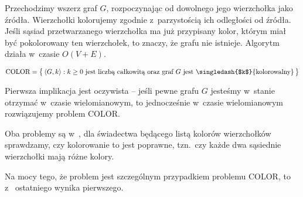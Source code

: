 
\subproblem %
Przechodzimy wszerz graf $G$, rozpoczynając od dowolnego jego wierzchołka jako źródła.
Wierzchołki kolorujemy zgodnie z~parzystością ich odległości od źródła.
Jeśli sąsiad przetwarzanego wierzchołka ma już przypisany kolor, którym miał być pokolorowany ten wierzchołek, to znaczy, że  grafu nie istnieje.
Algorytm działa w~czasie $O(V+E)$.

\subproblem %
\[
	\text{COLOR} = \bigl\{\,\langle G,k\rangle:\text{$k\ge0$ jest liczbą całkowitą oraz graf $G$ jest \singledash{$k$}{kolorowalny}}\,\bigr\}
\]

Pierwsza implikacja jest oczywista -- jeśli pewne  grafu $G$ jesteśmy w~stanie otrzymać w~czasie wielomianowym, to jednocześnie w~czasie wielomianowym rozwiązujemy problem COLOR.

\subproblem %
Oba problemy są w~\NPclass, dla świadectwa będącego listą kolorów wierzchołków sprawdzamy, czy kolorowanie to jest poprawne, tzn.\ czy każde dwa sąsiednie wierzchołki mają różne kolory.

Na mocy tego, że problem  jest szczególnym przypadkiem problemu COLOR, to z~ ostatniego wynika  pierwszego.

\subproblem %
\subproblem %
\subproblem %
